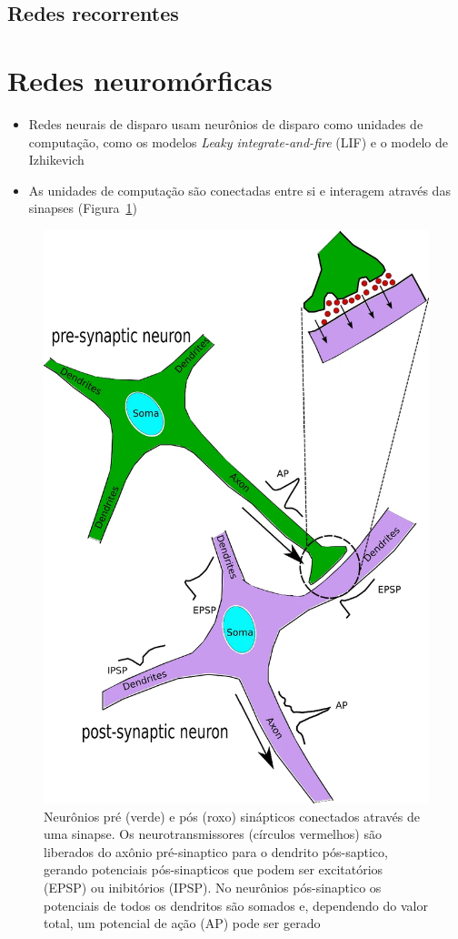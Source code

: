 \subsection{Redes recorrentes}

\section{Redes neuromórficas}\label{sec:redesneuromorficas}

\begin{itemize}
	\item Redes neurais de disparo usam neurônios de disparo como unidades de computação, como os modelos \textit{Leaky integrate-and-fire} (LIF) e o modelo de Izhikevich
	\item As unidades de computação são conectadas entre si e interagem através das sinapses (Figura~\ref{fig:sinapse})
\end{itemize}

\begin{figure}[h!]
	\centering
	\caption{Neurônios pré (verde) e pós (roxo) sinápticos conectados através de uma sinapse. Os neurotransmissores (círculos vermelhos) são liberados do axônio pré-sinaptico para o dendrito pós-saptico, gerando potenciais pós-sinapticos que podem ser excitatórios (EPSP) ou inibitórios (IPSP). No neurônios pós-sinaptico os potenciais de todos os dendritos são somados e, dependendo do valor total, um potencial de ação (AP) pode ser gerado}
	\label{fig:sinapse}
	\includegraphics[width=0.3\linewidth]{figs/sinapse}
\end{figure}

